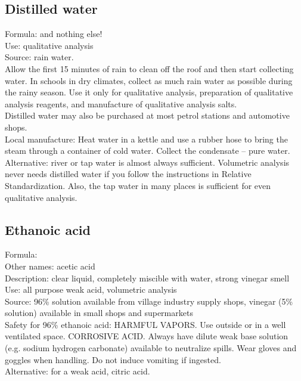 \subsection{Distilled water}
Formula:  and nothing else!\\
Use: qualitative analysis\\
Source: rain water.\\
Allow the first 15 minutes of rain to clean off the roof 
and then start collecting water. 
In schools in dry climates, 
collect as much rain water as possible during the rainy season. 
Use it only for qualitative analysis, 
preparation of qualitative analysis reagents, 
and manufacture of qualitative analysis salts.\\ 
Distilled water may also be purchased at most petrol stations 
and automotive shops.\\
Local manufacture: Heat water in a kettle 
and use a rubber hose to bring the steam through a container of cold water. 
Collect the condensate -- pure water.\\
Alternative: river or tap water is almost always sufficient. 
Volumetric analysis never needs distilled water 
if you follow the instructions in Relative Standardization. 
Also, 
the tap water in many places is sufficient for even qualitative analysis.
\subsection{Ethanoic acid}
\label{sec:ethanoic}
Formula: \\
Other names: acetic acid\\
Description: clear liquid, 
completely miscible with water, 
strong vinegar smell\\
Use: all purpose weak acid, 
volumetric analysis\\
Source: 96\% solution available from village industry supply shops, 
vinegar (5\% solution) available in small shops and supermarkets\\
Safety for 96\% ethanoic acid: HARMFUL VAPORS. 
Use outside or in a well ventilated space. 
CORROSIVE ACID. 
Always have dilute weak base solution (e.g. 
sodium hydrogen carbonate) available to neutralize spills. 
Wear gloves and goggles when handling. 
Do not induce vomiting if ingested.\\
Alternative: for a weak acid, 
citric acid. 
